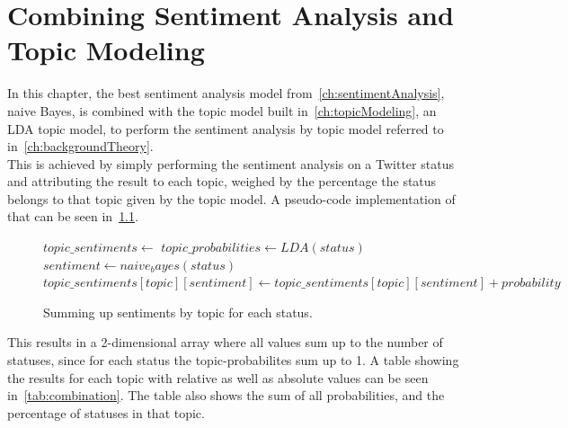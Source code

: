 \chapter{Combining Sentiment Analysis and Topic Modeling}
\label{ch:combiningSentimentAnalysisAndTopicModeling}


In this chapter, the best sentiment analysis model from~\ref{ch:sentimentAnalysis}, naive Bayes,
is combined with the topic model built in~\ref{ch:topicModeling}, an LDA topic model,
to perform the sentiment analysis by topic model referred to in~\ref{ch:backgroundTheory}.
\\
This is achieved by simply performing the sentiment analysis on a Twitter status and attributing the result to each topic,
weighed by the percentage the status belongs to that topic given by the topic model.
A pseudo-code implementation of that can be seen in~\ref{pseudo_code:sentiment_topic_summing}.

\begin{figure}
    \caption{Summing up sentiments by topic for each status.}
    \label{pseudo_code:sentiment_topic_summing}
    \begin{algorithmic}
        \State $topic\_sentiments \gets {}$ %
            \State $topic\_probabilities \gets LDA(status)$
            \State $sentiment \gets naive_bayes(status)$
                \State $topic\_sentiments[topic][sentiment] \gets topic\_sentiments[topic][sentiment] + probability$
            \EndFor
        \EndFor
    \end{algorithmic}
\end{figure}

This results in a 2-dimensional array where all values sum up to the number of statuses,
since for each status the topic-probabilites sum up to 1.
A table showing the results for each topic with relative as well as absolute values can be seen in~\ref{tab:combination}.
The table also shows the sum of all probabilities, and the percentage of statuses in that topic.

